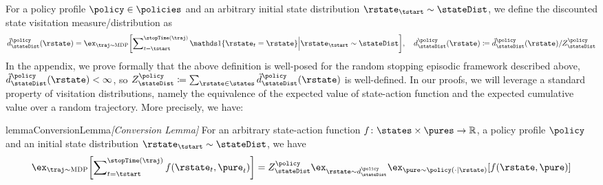 For a policy profile $\policy \in \policies$ and an arbitrary initial state distribution $\rstate_\tstart\sim\stateDist$, we define the discounted state visitation measure/distribution as
\begin{equation*}
		\visitMeas{\stateDist}{\policy}\parens{\rstate} =\ex_{\traj \sim \MDP}\bracks*{\insum_{\time =\tstart}^{\stopTime\parens{\traj}}\one\braces{\rstate_{\time}=\rstate} \Big| \rstate_\tstart \sim \stateDist},\quad	\visitDistr{\stateDist}{\policy}\parens{\rstate} \defeq \visitMeas{\stateDist}{\policy}\parens{\rstate}/\normConst{\stateDist}{\policy}
\end{equation*}
In the appendix, we prove formally that the above definition is well-posed for the random stopping episodic framework described above, \ie
$\visitMeas{\stateDist}{\policy}\parens{\rstate}<\infty$,
so
$\normConst{\stateDist}{\policy}\defeq\sum_{\rstate\in\states }\visitMeas{\stateDist}{\policy}\parens{\rstate}$
is well-defined.
In our proofs, we will leverage a standard property of visitation distributions, namely the equivalence of the expected value of state-action function and the expected cumulative value over a random trajectory.
More precisely, we have:
\begin{restatable}{lemma}{ConversionLemma}\emph{[Conversion Lemma]}
\label{lem:conversion}
For an arbitrary state-action function $f\from\states\times \pures \to \R$, a policy profile $\policy$ and an initial state distribution $\rstate_\tstart\sim\stateDist$, we have
\begin{equation}
  \ex_{\traj \sim \MDP}\bracks*{\insum_{\time =\tstart}^{\stopTime\parens{\traj}}f( \rstate_\time, \pure_\time)} 
  = \normConst{\stateDist}{\policy}
  \ex_{\rstate\sim\visitDistr{\stateDist}{\policy}}\ex_{\pure\sim\policy(\cdot \mid \rstate)}\bracks*{f(\rstate, \pure)}
\end{equation}
\end{restatable}
